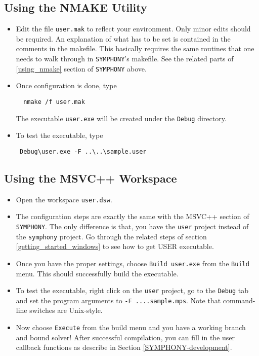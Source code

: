 \subsection{Using the NMAKE Utility}

\begin{itemize}
\item 
Edit the file \texttt{user.mak} to reflect your environment. 
Only minor edits should be required. An explanation of 
what has to be set is contained in the comments in the makefile. 
This basically 
requires the same routines that one needs to walk through in 
\texttt{SYMPHONY}'s makefile. 
See the related parts of \ref{using_nmake} section 
of \texttt{SYMPHONY} above.

\item Once configuration is done, type 
{\color{Brown}
\begin{verbatim}
  nmake /f user.mak
\end{verbatim}
}
The executable \texttt{user.exe} will be created under the 
\texttt{Debug} directory.
\item To test the executable, type 
{\color{Brown}
\begin{verbatim}
 Debug\user.exe -F ..\..\sample.user
\end{verbatim}
}
\end{itemize}

\subsection{Using the MSVC++ Workspace}

\begin{itemize}
\item Open the workspace 
\texttt{user.dsw}.

\item 
The configuration steps are exactly the same with the MSVC++ section of 
\texttt{SYMPHONY}. The only 
difference is that, you have the \texttt{user} project instead of the
\texttt{symphony} project. Go through the related steps of section 
\ref{getting_started_windows} to see how to get USER executable. 

\item
Once you have the proper settings, choose \texttt{Build
user.exe} from the \texttt{Build} menu. This should successfully 
build the executable.

\item
To test the executable, right click on the \texttt{user} project, go to the
\texttt{Debug} tab and set the program arguments to 
\texttt{-F ..\bs ..\bs sample.mps}. Note that command-line switches are 
Unix-style.

\item
Now choose \texttt{Execute} from the build menu and you have a working branch
and bound solver! After successful compilation, you can fill in the user
callback functions as describe in Section \ref{SYMPHONY-development}.
\end{itemize}

